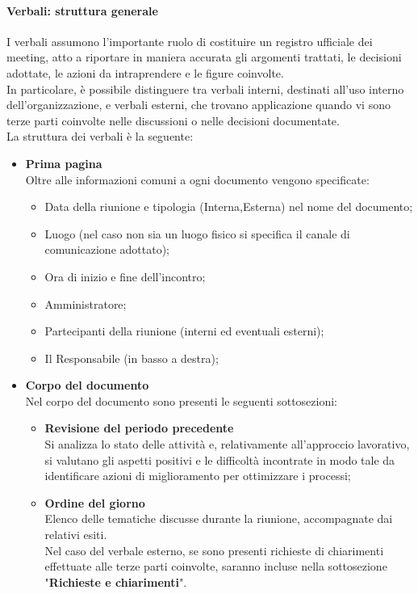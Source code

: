 \paragraph{Verbali: struttura generale}
\label{sec:Verbali}
I verbali assumono l'importante ruolo di costituire un registro ufficiale dei meeting, atto a riportare in maniera accurata gli argomenti trattati, le decisioni adottate, le azioni da intraprendere e le figure coinvolte.\\
In particolare, è possibile distinguere tra verbali interni, destinati all'uso interno dell'organizzazione, e verbali esterni, che trovano applicazione quando vi sono terze parti coinvolte nelle discussioni o nelle decisioni documentate.\\
La struttura dei verbali è la seguente: 
\begin{itemize}
    \item \textbf{Prima pagina} \\
        Oltre alle informazioni comuni a ogni documento vengono specificate:
        \begin{itemize}
            \item Data della riunione e tipologia (Interna,Esterna) nel nome del documento;
            \item Luogo (nel caso non sia un luogo fisico si specifica il canale di comunicazione adottato);
            \item Ora di inizio e fine dell'incontro;
            \item Amministratore;
            \item Partecipanti della riunione (interni ed eventuali esterni);
            \item Il Responsabile (in basso a destra);
        \end{itemize}
    \item \textbf{Corpo del documento} \\
        Nel corpo del documento sono presenti le seguenti sottosezioni:
        \begin{itemize}
            \item \textbf{Revisione del periodo precedente} \\
            Si analizza lo stato delle attività e, relativamente all'approccio lavorativo, si valutano gli aspetti positivi e le difficoltà incontrate in modo tale da identificare azioni di miglioramento per ottimizzare i processi;
            \item \textbf{Ordine del giorno} \\
            Elenco delle tematiche discusse durante la riunione, accompagnate dai relativi esiti. \\
            Nel caso del verbale esterno, se sono presenti richieste di chiarimenti effettuate alle terze parti coinvolte, saranno incluse nella sottosezione "\textbf{Richieste e chiarimenti}".
        

\end{itemize}
\end{itemize}
